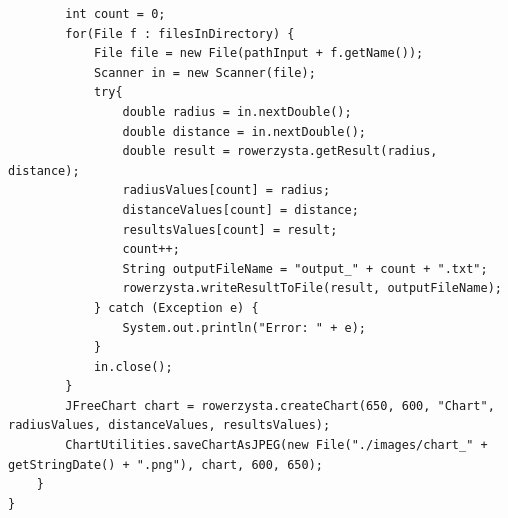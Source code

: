 \documentclass[12pt,a4paper]{article}
\begin{document}
\begin{itemize}
\begin{lstlisting}
        int count = 0;
        for(File f : filesInDirectory) {
            File file = new File(pathInput + f.getName());
            Scanner in = new Scanner(file);
            try{
                double radius = in.nextDouble();
                double distance = in.nextDouble();
                double result = rowerzysta.getResult(radius, distance);
                radiusValues[count] = radius;
                distanceValues[count] = distance;
                resultsValues[count] = result;
                count++;
                String outputFileName = "output_" + count + ".txt";
                rowerzysta.writeResultToFile(result, outputFileName);
            } catch (Exception e) {
                System.out.println("Error: " + e);
            }
            in.close();
        }
        JFreeChart chart = rowerzysta.createChart(650, 600, "Chart", radiusValues, distanceValues, resultsValues);
        ChartUtilities.saveChartAsJPEG(new File("./images/chart_" + getStringDate() + ".png"), chart, 600, 650);
    }
}

	\end{lstlisting}
	\end{itemize}
\end{document}
